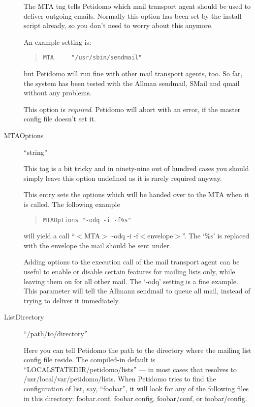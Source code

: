 \documentclass[a4paper,10pt]{scrreprt}
\newcommand{\file}[1]{{\sf #1}}
\begin{document}
\begin{description}
The MTA tag tells Petidomo which mail transport agent should be used
to deliver outgoing emails. Normally this option has been set by the
install script already, so you don't need to worry about this anymore.

An example setting is:
\begin{quote}
\begin{verbatim}
MTA     "/usr/sbin/sendmail"
\end{verbatim}
\end{quote}
but Petidomo will run fine with other mail transport agents, too. So
far, the system has been tested with the Allman sendmail, SMail and
qmail without any problems.

This option is \emph{required}. Petidomo will abort with an error,
if the master config file doesn't set it.


\item[MTAOptions] \hfill ``string''

This tag is a bit tricky and in ninety-nine out of hundred cases you
should simply leave this option undefined as it is rarely required
anyway.

This entry sets the options which will be handed over to the MTA
when it is called. The following example
\begin{quote}
\begin{verbatim}
MTAOptions "-odq -i -f%s"
\end{verbatim}
\end{quote}
will yield a call ``$<$MTA$>$ -odq -i -f$<$envelope$>$''. The `\%s' is
replaced with the envelope the mail should be sent under.

Adding options to the execution call of the mail transport agent can
be useful to enable or disable certain features for mailing lists
only, while leaving them on for all other mail. The `-odq' setting is
a fine example. This parameter will tell the Allmann sendmail to queue
all mail, instead of trying to deliver it immediately.


\item[ListDirectory] \hfill ``/path/to/directory''

Here you can tell Petidomo the path to the directory where the mailing
list config file reside. The compiled-in default is
``LOCALSTATEDIR/petidomo/lists'' --- in most cases that resolves to
\file{/usr/local/var/petidomo/lists}. When Petidomo tries to find the
configuration of list, say, ``foobar'', it will look for any of the
following files in this directory: \file{foobar.conf},
\file{foobar.config}, \file{foobar/conf}, or \file{foobar/config}.


\end{description}
\end{document}
